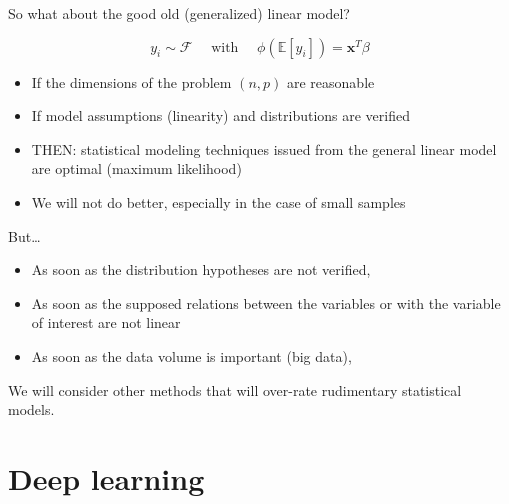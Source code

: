\documentclass[ignorenonframetext,]{beamer}
\providecommand{\tightlist}{%
  \setlength{\itemsep}{0pt}\setlength{\parskip}{0pt}}
\begin{document}
\begin{frame}{So what about the good old (generalized) linear model?}
\protect\hypertarget{so-what-about-the-good-old-generalized-linear-model}{}

\[ y_i \sim  \mathcal{F} \quad \mbox{ with } \quad \phi(\mathbb{E}[y_i]) = \mathbf{x}^T\beta\]

\begin{itemize}
\tightlist
\item
  If the dimensions of the problem \((n, p)\) are reasonable
\item
  If model assumptions (linearity) and distributions are verified
\item
  THEN: statistical modeling techniques issued from the general linear
  model are optimal (maximum likelihood)
\item
  We will not do better, especially in the case of small samples
\end{itemize}

\end{frame}

\begin{frame}{But\ldots{}}
\protect\hypertarget{but}{}

\begin{itemize}
\tightlist
\item
  As soon as the distribution hypotheses are not verified,
\item
  As soon as the supposed relations between the variables or with the
  variable of interest are not linear
\item
  As soon as the data volume is important (big data),
\end{itemize}

We will consider other methods that will over-rate rudimentary
statistical models.

\end{frame}

\hypertarget{deep-learning}{%
\section{Deep learning}\label{deep-learning}}
\end{document}
